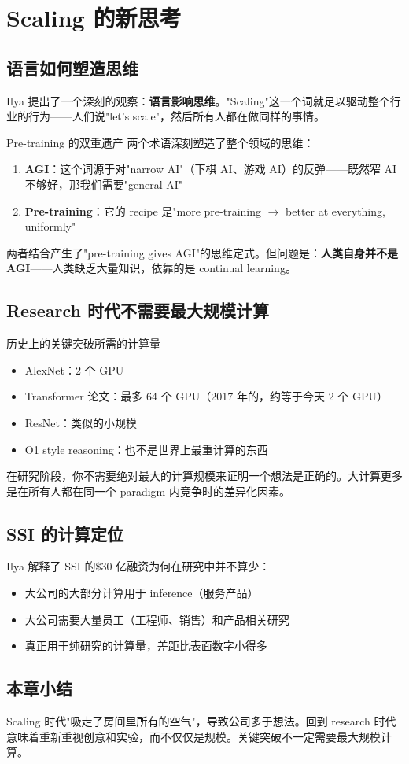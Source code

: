 \section{Scaling 的新思考}

\subsection{语言如何塑造思维}

Ilya 提出了一个深刻的观察：\textbf{语言影响思维}。"Scaling"这一个词就足以驱动整个行业的行为——人们说"let's scale"，然后所有人都在做同样的事情。

\begin{importantbox}{Pre-training 的双重遗产}
两个术语深刻塑造了整个领域的思维：
\begin{enumerate}
    \item \textbf{AGI}：这个词源于对"narrow AI"（下棋 AI、游戏 AI）的反弹——既然窄 AI 不够好，那我们需要"general AI"
    \item \textbf{Pre-training}：它的 recipe 是"more pre-training $\rightarrow$ better at everything, uniformly"
\end{enumerate}
两者结合产生了"pre-training gives AGI"的思维定式。但问题是：\textbf{人类自身并不是 AGI}——人类缺乏大量知识，依靠的是 continual learning。
\end{importantbox}

\subsection{Research 时代不需要最大规模计算}

\begin{knowledgebox}{历史上的关键突破所需的计算量}
\begin{itemize}
    \item AlexNet：2 个 GPU
    \item Transformer 论文：最多 64 个 GPU（2017 年的，约等于今天 2 个 GPU）
    \item ResNet：类似的小规模
    \item O1 style reasoning：也不是世界上最重计算的东西
\end{itemize}
在研究阶段，你不需要绝对最大的计算规模来证明一个想法是正确的。大计算更多是在所有人都在同一个 paradigm 内竞争时的差异化因素。
\end{knowledgebox}

\subsection{SSI 的计算定位}

Ilya 解释了 SSI 的\$30 亿融资为何在研究中并不算少：
\begin{itemize}
    \item 大公司的大部分计算用于 inference（服务产品）
    \item 大公司需要大量员工（工程师、销售）和产品相关研究
    \item 真正用于纯研究的计算量，差距比表面数字小得多
\end{itemize}

\subsection{本章小结}

Scaling 时代"吸走了房间里所有的空气"，导致公司多于想法。回到 research 时代意味着重新重视创意和实验，而不仅仅是规模。关键突破不一定需要最大规模计算。


